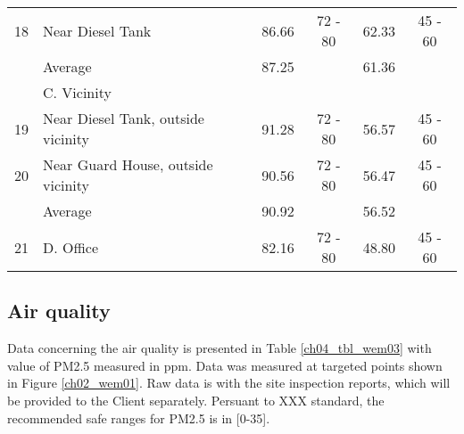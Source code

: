 \begin{table}[!h]
{\begin{tabular}{c|l|c|c|c|c}
	18 & Near Diesel Tank & 86.66 & 72 - 80 & 62.33 & 45 - 60 \\ 
	& Average & 87.25 &  & 61.36 &  \\ 
	\hline
	& C. Vicinity &  &  &  &  \\ 
	19 & Near Diesel Tank, outside vicinity & 91.28 & 72 - 80 & 56.57 & 45 - 60 \\ 
	20 & Near Guard House, outside vicinity & 90.56 & 72 - 80 & 56.47 & 45 - 60 \\ 
	& Average & 90.92 &  & 56.52 &  \\ 
	\hline
	21 & D. Office & 82.16 & 72 - 80 & 48.80 & 45 - 60 \\ 
	\hline
\end{tabular}

	}
\end{table}




\subsection{Air quality}\label{aq01}

Data concerning the air quality is presented in Table \ref{ch04_tbl_wem03} with value of PM2.5 measured in ppm. Data was measured at targeted points shown in Figure \ref{ch02_wem01}. Raw data is with the site inspection reports, which will be provided to the Client separately. Persuant to XXX standard, the recommended safe ranges for PM2.5 is in [0-35].


